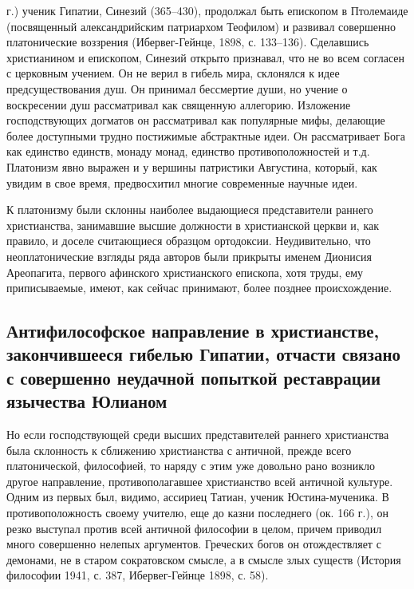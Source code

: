 г.)  ученик  Гипатии,  Синезий (365--430),  продолжал  быть  епископом
в  Птолемаиде  (посвященный  александрийским  патриархом  Теофилом)  и
развивал  совершенно  платонические воззрения  (Ибервег-Гейнце,  1898,
с.  133--136). Сделавшись  христианином и  епископом, Синезий  открыто
признавал,  что  не  во  всем  согласен с  церковным  учением.  Он  не
верил  в  гибель мира,  склонялся  к  идее предсуществования  душ.  Он
принимал бессмертие души, но учение о воскресении душ рассматривал как
священную аллегорию. Изложение господствующих догматов он рассматривал
как  популярные  мифы,  делающие более  доступными  трудно  постижимые
абстрактные идеи.  Он рассматривает Бога как  единство единств, монаду
монад, единство противоположностей  и т.д. Платонизм явно  выражен и у
вершины  патристики  Августина,  который,  как увидим  в  свое  время,
предвосхитил многие современные научные идеи.

К платонизму  были склонны  наиболее выдающиеся  представители раннего
христианства, занимавшие высшие должности в христианской церкви и, как
правило,  и  доселе  считающиеся образцом  ортодоксии.  Неудивительно,
что  неоплатонические  взгляды  ряда   авторов  были  прикрыты  именем
Дионисия  Ареопагита, первого  афинского христианского  епископа, хотя
труды, ему  приписываемые, имеют, как сейчас  принимают, более позднее
происхождение.

\subsection{Антифилософское направление  в христианстве, закончившееся
гибелью  Гипатии,  отчасти  связано с  совершенно  неудачной  попыткой
реставрации язычества Юлианом}

Но   если   господствующей   среди   высших   представителей   раннего
христианства  была склонность  к  сближению  христианства с  античной,
прежде всего платонической, философией, то  наряду с этим уже довольно
рано возникло другое  направление, противополагавшее христианство всей
античной  культуре.  Одним из  первых  был,  видимо, ассириец  Татиан,
ученик  Юстина-мученика. В  противоположность своему  учителю, еще  до
казни  последнего  (ок.  166  г.),   он  резко  выступал  против  всей
античной философии  в целом, причем приводил  много совершенно нелепых
аргументов. Греческих богов  он отождествляет с демонами,  не в старом
сократовском смысле, а в смысле  злых существ (История философии 1941,
с. 387, Ибервег-Гейнце 1898, с. 58).


